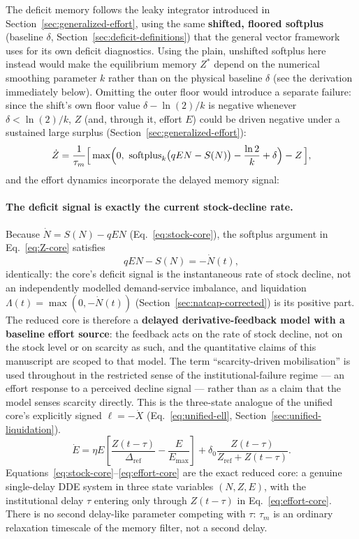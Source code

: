 \documentclass[twocolumn,10pt]{article}
\begin{document}
The deficit memory follows the leaky integrator introduced in Section~\ref{sec:generalized-effort}, using the same \textbf{shifted, floored softplus} (baseline $\delta$, Section~\ref{sec:deficit-definitions}) that the general vector framework uses for its own deficit diagnostics. Using the plain, unshifted softplus here instead would make the equilibrium memory $Z^*$ depend on the numerical smoothing parameter $k$ rather than on the physical baseline $\delta$ (see the derivation immediately below). Omitting the outer floor would introduce a separate failure: since the shift's own floor value $\delta-\ln(2)/k$ is negative whenever $\delta<\ln(2)/k$, $Z$ (and, through it, effort $E$) could be driven negative under a sustained large surplus (Section~\ref{sec:generalized-effort}):
\begin{equation}
\dot Z = \frac{1}{\tau_m}\Bigl[\,\max\Bigl(0,\ \text{softplus}_k\bigl(qEN - S(N)\bigr) - \frac{\ln 2}{k} + \delta\Bigr) - Z\,\Bigr],
\label{eq:Z-core}
\end{equation}
and the effort dynamics incorporate the delayed memory signal:

\paragraph{The deficit signal is exactly the current stock-decline rate.} Because $\dot N = S(N)-qEN$ (Eq.~\eqref{eq:stock-core}), the softplus argument in Eq.~\eqref{eq:Z-core} satisfies
\begin{equation}
qEN - S(N) = -\dot N(t), \label{eq:deficit-identity}
\end{equation}
identically: the core's deficit signal is the instantaneous rate of stock decline, not an independently modelled demand-service imbalance, and liquidation $\Lambda(t)=\max(0,-\dot N(t))$ (Section~\ref{sec:natcap-corrected}) is its positive part. The reduced core is therefore a \textbf{delayed derivative-feedback model with a baseline effort source}: the feedback acts on the rate of stock decline, not on the stock level or on scarcity as such, and the quantitative claims of this manuscript are scoped to that model. The term ``scarcity-driven mobilisation'' is used throughout in the restricted sense of the institutional-failure regime --- an effort response to a perceived decline signal --- rather than as a claim that the model senses scarcity directly. This is the three-state analogue of the unified core's explicitly signed $\ell=-\dot X$ (Eq.~\eqref{eq:unified-ell}, Section~\ref{sec:unified-liquidation}).
\begin{equation}
\dot{E} = \eta E \left[ \frac{Z(t-\tau)}{\Delta_{\text{ref}}} - \frac{E}{E_{\max}} \right] + \delta_0 \frac{Z(t-\tau)}{Z_{\text{ref}} + Z(t-\tau)}.
\label{eq:effort-core}
\end{equation}
Equations~\eqref{eq:stock-core}--\eqref{eq:effort-core} are the exact reduced core: a genuine single-delay DDE system in three state variables $(N,Z,E)$, with the institutional delay $\tau$ entering only through $Z(t-\tau)$ in Eq.~\eqref{eq:effort-core}. There is no second delay-like parameter competing with $\tau$: $\tau_m$ is an ordinary relaxation timescale of the memory filter, not a second delay.
\end{document}
